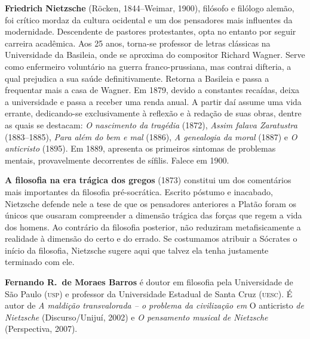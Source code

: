 \vspace*{7cm}
\noindent\textbf{Friedrich Nietzsche} (Röcken, 1844--Weimar, 1900), filósofo 
e filólogo alemão, foi crítico mordaz da cultura ocidental 
e um dos pensadores mais influentes da modernidade. Descendente de pastores 
protestantes, opta no entanto por seguir carreira acadêmica. 
Aos 25 anos, torna-se professor de letras clássicas na Universidade 
da Basileia, onde se aproxima do compositor Richard Wagner. Serve 
como enfermeiro voluntário na guerra franco-prussiana, mas contrai 
difteria, a qual prejudica a sua saúde definitivamente. Retorna a 
Basileia e passa a frequentar mais a casa de Wagner. Em 
1879, devido a constantes recaídas, deixa a universidade e passa a 
receber uma renda anual. A partir daí assume uma vida errante, 
dedicando-se exclusivamente à reflexão e à redação de suas obras, 
dentre as quais se destacam: \textit{O nascimento da tragédia} (1872), 
\textit{Assim falava Zaratustra} (1883--1885), \textit{Para além do bem e mal} (1886), 
\textit{A genealogia da moral} (1887) e \textit{O anticristo} (1895). Em 1889, 
apresenta os primeiros sintomas de problemas mentais, provavelmente 
decorrentes de sífilis. Falece em 1900.

\noindent\textbf{A filosofia na era trágica dos gregos} (1873) constitui um dos comentários 
mais importantes da filosofia pré{}-socrática. Escrito póstumo e inacabado, Nietzsche defende nele 
a tese de que os pensadores anteriores a Platão foram os únicos que ousaram compreender a dimensão 
trágica das forças que regem a vida dos homens. Ao contrário da filosofia posterior, não reduziram 
metafisicamente a realidade à dimensão do certo e do errado. Se costumamos atribuir a Sócrates o início 
da filosofia, Nietzsche sugere aqui que talvez ela tenha justamente terminado com ele.

\noindent\textbf{Fernando R.~de Moraes Barros} é doutor em filosofia pela Universidade 
de São Paulo (\textsc{usp}) e professor da Universidade Estadual de Santa Cruz 
(\textsc{uesc}). É autor de \textit{A maldição transvalorada -- o problema da civilização 
em} O anticristo \textit{de Nietzsche} (Discurso/Unijuí, 2002) 
e \textit{O pensamento musical de Nietzsche} (Perspectiva, 2007).


\clearpage